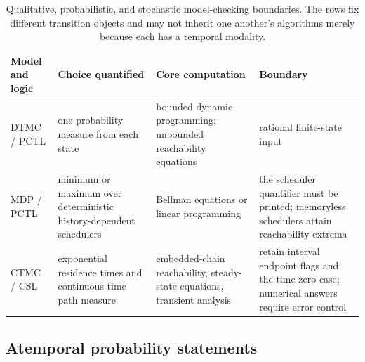 \begin{table}[htbp]
\centering\scriptsize
\begin{tabularx}{\textwidth}{@{}l X X X@{}}
\toprule
Model and logic & Choice quantified & Core computation & Boundary \\
\midrule
DTMC / PCTL & one probability measure from each state & bounded dynamic
programming; unbounded reachability equations & rational finite-state input \\
MDP / PCTL & minimum or maximum over deterministic history-dependent
schedulers & Bellman equations or linear programming & the scheduler
quantifier must be printed; memoryless schedulers attain reachability extrema \\
CTMC / CSL & exponential residence times and continuous-time path measure &
embedded-chain reachability, steady-state equations, transient analysis &
retain interval endpoint flags and the time-zero case; numerical answers
require error control \\
\bottomrule
\end{tabularx}
\caption{Qualitative, probabilistic, and stochastic model-checking boundaries.
The rows fix different transition objects and may not inherit one another's
algorithms merely because each has a temporal modality.}
\label{tab:p09-probabilistic-model-checking}
\end{table}

\subsection{Atemporal probability statements}

